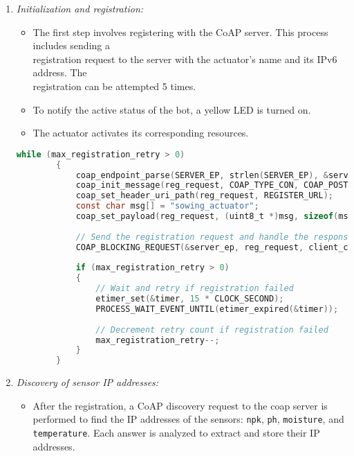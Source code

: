 \begin{enumerate}
    \item \textit{Initialization and registration:}
          \begin{itemize}
              \item The first step involves registering with the CoAP server. This process includes sending a\\
                    registration request to the server with the actuator's name and its IPv6 address. The\\
                    registration can be attempted 5 times.
              \item To notify the active status of the bot, a yellow LED is turned on.
              \item The actuator activates its corresponding resources.

          \end{itemize}

          \begin{lstlisting}[language=C]
        while (max_registration_retry > 0)
        {
            coap_endpoint_parse(SERVER_EP, strlen(SERVER_EP), &server_ep);
            coap_init_message(reg_request, COAP_TYPE_CON, COAP_POST, 0);
            coap_set_header_uri_path(reg_request, REGISTER_URL);
            const char msg[] = "sowing_actuator";
            coap_set_payload(reg_request, (uint8_t *)msg, sizeof(msg) - 1);
        
            // Send the registration request and handle the response
            COAP_BLOCKING_REQUEST(&server_ep, reg_request, client_chunk_handler);
        
            if (max_registration_retry > 0)
            {
                // Wait and retry if registration failed
                etimer_set(&timer, 15 * CLOCK_SECOND);
                PROCESS_WAIT_EVENT_UNTIL(etimer_expired(&timer));
        
                // Decrement retry count if registration failed
                max_registration_retry--;
            }
        }
    \end{lstlisting}

    \item \textit{Discovery of sensor IP addresses:}
          \begin{itemize}
              \item After the registration, a CoAP discovery request to the coap server is performed to find the IP addresses of the sensors: \texttt{npk}, \texttt{ph}, \texttt{moisture}, and \texttt{temperature}. Each answer is analyzed to extract and store their IP addresses.
          \end{itemize}


\end{enumerate}
